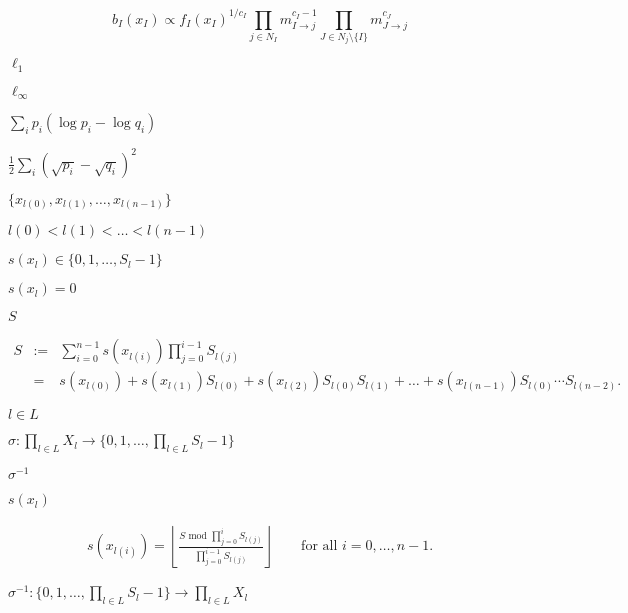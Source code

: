 \documentclass{article}
\begin{document}
\[ b_I(x_I) \propto f_I(x_I)^{1/c_I} \prod_{j \in N_I} m_{I\to j}^{c_I-1} \prod_{J\in N_j\setminus\{I\}} m_{J\to j}^{c_J} \]
\pagebreak

$\ell_1$
\pagebreak

$\ell_\infty$
\pagebreak

$\sum_i p_i (\log p_i - \log q_i)$
\pagebreak

$\frac{1}{2}\sum_i (\sqrt{p_i}-\sqrt{q_i})^2$
\pagebreak

$\{x_{l(0)},x_{l(1)},\dots,x_{l(n-1)}\}$
\pagebreak

$l(0) < l(1) < \dots < l(n-1)$
\pagebreak

$s(x_l) \in \{0,1,\dots,S_l-1\}$
\pagebreak

$s(x_l)=0$
\pagebreak

$S$
\pagebreak

\begin{eqnarray*}
  S &:=& \sum_{i=0}^{n-1} s(x_{l(i)}) \prod_{j=0}^{i-1} S_{l(j)} \\
    &= & s(x_{l(0)}) + s(x_{l(1)}) S_{l(0)} + s(x_{l(2)}) S_{l(0)} S_{l(1)} + \dots + s(x_{l(n-1)}) S_{l(0)} \cdots S_{l(n-2)}.
\end{eqnarray*}
\pagebreak

$l\in L$
\pagebreak

$\sigma : \prod_{l\in L} X_l \to \{0,1,\dots,\prod_{l\in L} S_l-1\}$
\pagebreak

$\sigma^{-1}$
\pagebreak

$s(x_l)$
\pagebreak

\begin{eqnarray*}
  s(x_{l(i)}) = \left\lfloor\frac{S \mbox { mod } \prod_{j=0}^{i} S_{l(j)}}{\prod_{j=0}^{i-1} S_{l(j)}}\right\rfloor \qquad \mbox{for all $i=0,\dots,n-1$}.
\end{eqnarray*}
\pagebreak

$\sigma^{-1} : \{0,1,\dots,\prod_{l\in L} S_l-1\} \to \prod_{l\in L} X_l$
\pagebreak
\end{document}
